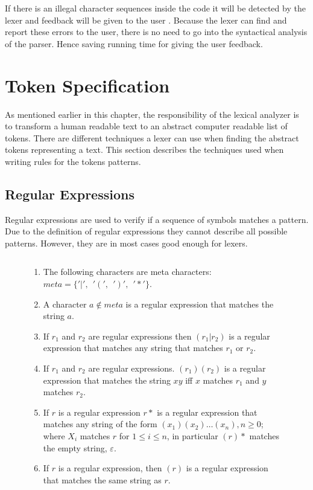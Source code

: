 If there is an illegal character sequences inside the code it will be detected
by the lexer and feedback will be given to the user \cite{sebesta2012}. Because
the lexer can find and report these errors to the user, there is no need to go
into the syntactical analysis of the parser. Hence saving running time for
giving the user feedback.

\section{Token Specification}
As mentioned earlier in this chapter, the responsibility of the lexical analyzer
is to transform a human readable text to an abstract computer readable list of
tokens. There are different techniques a lexer can use when finding the
abstract tokens representing a text. This section describes the techniques used
when writing rules for the tokens patterns.

\subsection{Regular Expressions}
Regular expressions are used to verify if a sequence of symbols matches a
pattern. Due to the definition of regular expressions they cannot describe all
possible patterns. However, they are in most cases good enough for lexers.

\begin{figure}[hb!]
\begin{definition}\label{regexp} $ $\\
\begin{enumerate}
  \item The following characters are meta characters: $meta = \{ '|', ~~ '(', ~~ ')', ~~ '*' \}$.
  \item A character $a \notin meta$ is a regular expression that matches the 
      string $a$.
  \item If $r_1$ and $r_2$ are regular expressions then $(r_1 | r_2)$ is a 
      regular expression that matches any string that matches $r_1$ or $r_2$.
  \item If $r_1$ and $r_2$ are regular expressions. $(r_1)(r_2)$ is a regular
      expression that matches the string $xy$ iff $x$ matches $r_1$
      and $y$ matches $r_2$.
  \item If $r$ is a regular expression $r*$ is a regular expression that
      matches any string of the form $(x_1)(x_2) \dots  (x_n), n \geq 0$;
      where $X_i$ matches $r$ for $1 \leq i \leq n$, in particular $(r)*$ 
      matches the empty string, $\varepsilon$.
  \item If $r$ is a regular expression, then $(r)$ is a regular expression that
      matches the same string as $r$.
\end{enumerate}
\qeda
\end{definition}
\end{figure}

